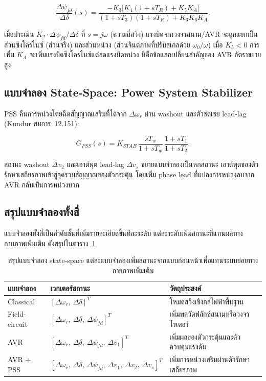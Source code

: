 \documentclass[12pt,a4paper]{article}
\newcommand{\dwr}{\Delta\omega_r}
\newcommand{\ddel}{\Delta\delta}
\newcommand{\dpsifd}{\Delta\psi_{fd}}
\begin{document}
\begin{equation}
\frac{\dpsifd}{\ddel}(s) =
\frac{-K_3\bigl[K_4(1+sT_R) + K_5 K_A\bigr]}
     {(1+sT_3)(1+sT_R) + K_3 K_6 K_A}.
\label{eq:psifd}
\end{equation}

เมื่อประเมิน $K_2 \cdot \dpsifd/\ddel$ ที่ $s = j\omega$ (ความถี่สวิง)
แรงบิดจากวงจรสนาม/AVR จะถูกแยกเป็นส่วนซิงโครไนซ์ (ส่วนจริง)
และส่วนหน่วง (ส่วนจินตภาพที่ปรับสเกลด้วย $\omega_0/\omega$)
เมื่อ $K_5<0$ การเพิ่ม $K_A$ จะเพิ่มแรงบิดซิงโครไนซ์แต่ลดแรงบิดหน่วง
นี่คือข้อแลกเปลี่ยนสำคัญของ AVR อัตราขยายสูง

\subsection{แบบจำลอง State-Space: Power System Stabilizer}

PSS คืนการหน่วงโดยฉีดสัญญาณเสริมที่ได้จาก $\dwr$
ผ่าน washout และตัวชดเชย lead-lag (Kundur สมการ~12.151):

\begin{equation}
G_{PSS}(s) = K_{STAB}\,
\frac{sT_w}{1+sT_w}\,
\frac{1+sT_1}{1+sT_2}.
\end{equation}

สถานะ washout $\Delta v_2$ และเอาต์พุต lead-lag $\Delta v_s$
ขยายแบบจำลองเป็นหกสถานะ
เอาต์พุตของตัวรักษาเสถียรภาพเข้าสู่จุดรวมสัญญาณของตัวกระตุ้น
โดยเพิ่ม phase lead ที่แปลงการหน่วงลบจาก AVR กลับเป็นการหน่วงบวก

\subsection{สรุปแบบจำลองทั้งสี่}

แบบจำลองทั้งสี่เป็นลำดับชั้นที่เพิ่มรายละเอียดขึ้นทีละระดับ
แต่ละระดับเพิ่มสถานะที่แทนผลทางกายภาพเพิ่มเติม ดังสรุปในตาราง~\ref{tab:statevec}

\begin{table}[H]
\centering
\caption{สรุปแบบจำลอง state-space แต่ละแบบจำลองเพิ่มสถานะจากแบบก่อนหน้าเพื่อแทนระบบย่อยทางกายภาพเพิ่มเติม}
\label{tab:statevec}
\begin{tabular}{@{}l l p{6.2cm}@{}}
\toprule
แบบจำลอง & เวกเตอร์สถานะ & วัตถุประสงค์ \\
\midrule
Classical    & $[\dwr,\ \ddel]^T$
             & โหมดสวิงเชิงกลไฟฟ้าพื้นฐาน \\
Field-circuit & $[\dwr,\ \ddel,\ \dpsifd]^T$
             & เพิ่มพลวัตฟลักซ์สนามหรือวงจรโรเตอร์ \\
AVR          & $[\dwr,\ \ddel,\ \dpsifd,\ \Delta v_1]^T$
             & เพิ่มผลของตัวกระตุ้นและตัวควบคุมแรงดัน \\
AVR + PSS    & $[\dwr,\ \ddel,\ \dpsifd,\ \Delta v_1,\ \Delta v_2,\ \Delta v_s]^T$
             & เพิ่มการหน่วงเสริมผ่านตัวรักษาเสถียรภาพ \\
\bottomrule
\end{tabular}
\end{table}
\end{document}

